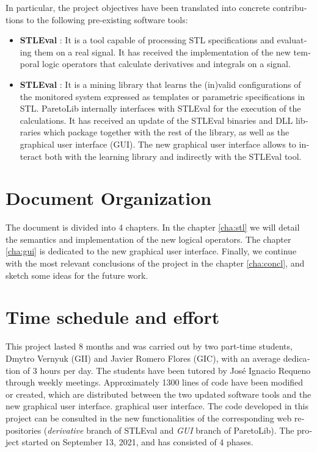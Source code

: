 \begin{otherlanguage}{british}
In particular, the project objectives have been translated into concrete contributions to the following pre-existing software tools:

\begin{itemize}
\item \textbf{STLEval} \cite{StlEval}: It is a tool capable of processing STL specifications and evaluating them on a real signal. It has received the implementation of the new temporal logic operators that calculate derivatives and integrals on a signal.
\item \textbf{STLEval} \cite{StlEval}: It is a mining library that learns the (in)valid configurations of the monitored system expressed as templates or parametric specifications in STL.
ParetoLib internally interfaces with STLEval for the execution of the calculations. It has received an update of the STLEval binaries and DLL libraries which package together with the rest of the library, as well as the graphical user interface (GUI). The new graphical user interface  allows to interact both with the learning library and indirectly with the STLEval tool.
\end{itemize}

\section{Document Organization}

The document is divided into 4 chapters. In the chapter \ref{cha:stl} we will detail the semantics and implementation of the new logical operators. The chapter \ref{cha:gui} is dedicated to the new graphical user interface. Finally, we continue with the most relevant conclusions of the project in the chapter \ref{cha:concl}, and sketch some ideas for the future work. %

\section{Time schedule and effort}
This project lasted 8 months and was carried out by two part-time students, Dmytro Vernyuk (GII) and Javier Romero Flores (GIC), with an average dedication of 3 hours per day. The students have been tutored by José Ignacio Requeno through weekly meetings. Approximately 1300 lines of code have been modified or created, which are distributed between the two updated software tools and the new graphical user interface.
graphical user interface. The code developed in this project can be consulted in the new functionalities of the corresponding web repositories (\textit{derivative} branch of STLEval and \textit{GUI} branch of ParetoLib). The project started on September 13, 2021, and has consisted of 4 phases.



\end{otherlanguage}
